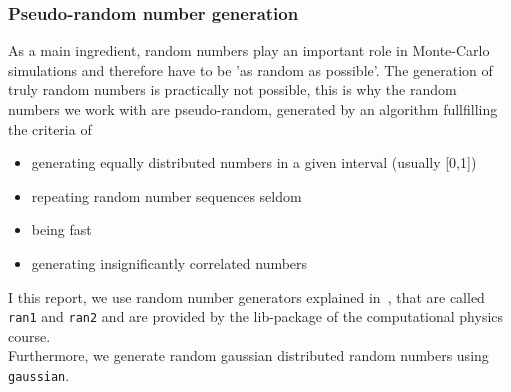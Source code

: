 \subsubsection{Pseudo-random number generation}\label{sec:ran}
As a main ingredient, random numbers play an important role in Monte-Carlo simulations and therefore have to be 'as random as possible'. The generation of truly random numbers is practically not possible, this is why the random numbers we work with are pseudo-random, generated by an algorithm fullfilling the criteria of
\begin{itemize}
\item generating equally distributed numbers in a given interval (usually [0,1])
\item repeating random number sequences seldom
\item being fast
\item generating insignificantly correlated numbers
\end{itemize}
I this report, we use random number generators explained in~\cite{numerical}, that are called \texttt{ran1} and \texttt{ran2} and are provided by the lib-package of the computational physics course.\\
Furthermore, we generate random gaussian distributed random numbers using \texttt{gaussian}. 
